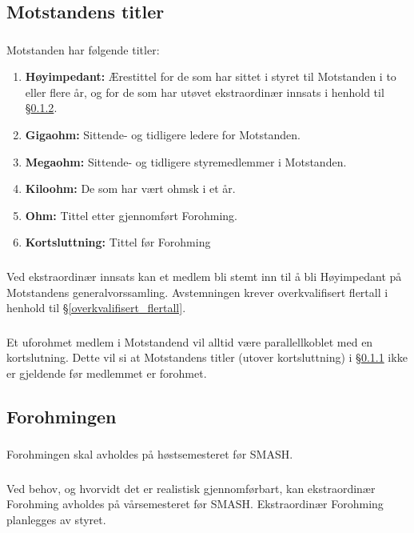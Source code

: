 \documentclass{article}
\newenvironment{statute}[1][]
    {
        \titleformat{\subsubsection}[runin]{\normalfont}{\hspace{1pt}\textit{\S\hspace{5pt}\thesubsubsection}}{0pt}{\rule{4pt}{0pt}}{}
        \subsubsection{}#1
        \begin{minipage}[t]{0.9\linewidth}
    }
    {
        \end{minipage}
        
        \ignorespacesafterend
    }
\begin{document}
        \subsection{Motstandens titler}
            \begin{statute}[\label{motstandens_titler}]
                Motstanden har følgende titler:
                \begin{enumerate}[font = \bfseries]
                    \item \textbf{Høyimpedant:} Ærestittel for de som har sittet i styret til Motstanden i to eller flere år, og for de som har utøvet ekstraordinær innsats i henhold til \S\hspace{3pt}\ref{stemt_til_høyimpedant}.
                    \item \textbf{Gigaohm:} Sittende- og tidligere ledere for Motstanden.
                    \item \textbf{Megaohm:} Sittende- og tidligere styremedlemmer i Motstanden.
                    \item \textbf{Kiloohm:} De som har vært ohmsk i et år.
                    \item \textbf{Ohm:} Tittel etter gjennomført Forohming.
                    \item \textbf{Kortsluttning:} Tittel før Forohming
                \end{enumerate}
            \end{statute}
            \begin{statute}[\label{stemt_til_høyimpedant}]
            	Ved ekstraordinær innsats kan et medlem bli stemt inn til å bli Høyimpedant på Motstandens generalvorssamling. Avstemningen krever overkvalifisert flertall i henhold til \S\hspace{3pt}\ref{overkvalifisert_flertall}.
            \end{statute}
        	\begin{statute}
        		Et uforohmet medlem i Motstandend vil alltid være parallellkoblet med en kortslutning. Dette vil si at Motstandens titler (utover kortsluttning) i \S\hspace{3pt}\ref{motstandens_titler} ikke er gjeldende før medlemmet er forohmet.  
        	\end{statute}
            
        \subsection{Forohmingen}     
             \begin{statute}
                Forohmingen skal avholdes på høstsemesteret før SMASH.
            \end{statute}
             \begin{statute}
                Ved behov, og hvorvidt det er realistisk gjennomførbart, kan ekstraordinær Forohming avholdes på vårsemesteret før SMASH. Ekstraordinær Forohming planlegges av styret.
             \end{statute}
             
\end{document}
